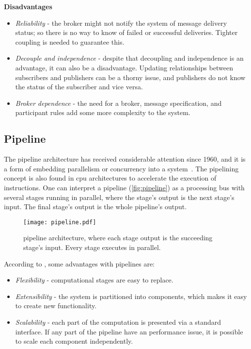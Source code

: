 \textbf{Disadvantages}
\begin{itemize}
    \item \emph{Reliability} -  the broker might not notify the system of message delivery status; so there is no way to know of failed or successful deliveries. Tighter coupling is needed to guarantee this.
    
    \item \emph{Decouple and independence} - despite that decoupling and independence is an advantage, it can also be a disadvantage. Updating relationships between subscribers and publishers can be a thorny issue, and publishers do not know the status of the subscriber and vice versa.
    
    \item \emph{Broker dependence} - the need for a broker, message specification, and participant rules add some more complexity to the system.
\end{itemize}

\newpage
\subsection{Pipeline}
The pipeline architecture has received considerable attention since 1960, and it is a form of embedding parallelism or concurrency into a system~\cite{ramamoorthy1977pipeline}. The pipelining concept is also found in \ac{cpu} architectures to accelerate the execution of instructions. One can interpret a pipeline (\autoref{fig:pipeline}) as a processing bus with several stages running in parallel, where the stage's output is the next stage's input. The final stage's output is the whole pipeline's output.

\begin{figure}[ht]
    \centering
    \texttt{[image: pipeline.pdf]}
    \caption[Architecture - Pipeline]{pipeline architecture, where each stage output is the succeeding stage's input. Every stage executes in parallel.}
    \label{fig:pipeline}
\end{figure}

According to \cite{ml_pipeline_1}, some advantages with pipelines are:

\begin{itemize}
    \item \emph{Flexibility} - computational stages are easy to replace. 
    \item \emph{Extensibility} - the system is partitioned into components, which makes it easy to create new functionality.
    \item \emph{Scalability} - each part of the computation is presented via a standard interface. If any part of the pipeline have an performance issue, it is possible to scale each component independently.
\end{itemize}

